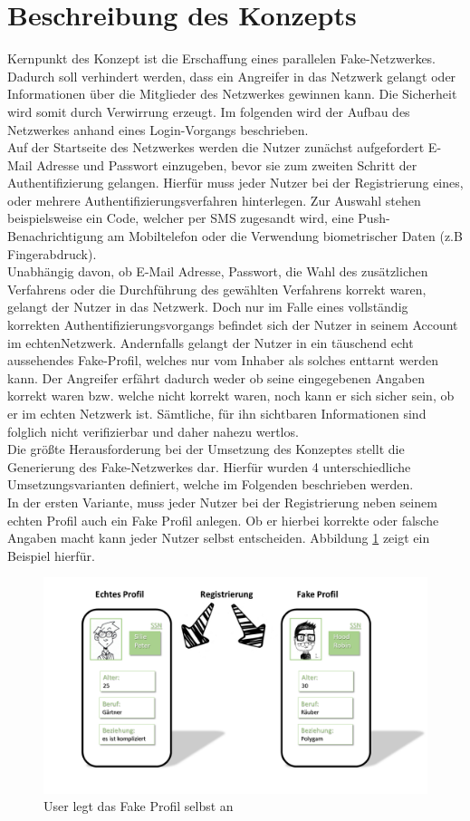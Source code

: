 \documentclass{sigchi}
\begin{document}
\section{Beschreibung des Konzepts}
\label{Konzept}
Kernpunkt des Konzept ist die Erschaffung eines parallelen Fake-Netzwerkes. Dadurch soll verhindert werden, dass ein Angreifer in das Netzwerk gelangt oder Informationen über die Mitglieder des Netzwerkes gewinnen kann. Die Sicherheit wird somit durch Verwirrung erzeugt. Im folgenden wird der Aufbau des Netzwerkes anhand eines Login-Vorgangs beschrieben. \\
Auf der Startseite des Netzwerkes werden die Nutzer zunächst aufgefordert E-Mail Adresse und Passwort einzugeben, bevor sie zum zweiten Schritt der Authentifizierung gelangen. Hierfür muss jeder Nutzer bei der Registrierung eines, oder mehrere Authentifizierungsverfahren hinterlegen. Zur Auswahl stehen beispielsweise ein Code, welcher per SMS zugesandt wird, eine Push-Benachrichtigung am Mobiltelefon oder die Verwendung biometrischer Daten (z.B Fingerabdruck).\\
Unabhängig davon, ob E-Mail Adresse, Passwort, die Wahl des zusätzlichen Verfahrens oder die Durchführung des gewählten Verfahrens korrekt waren, gelangt der Nutzer in das Netzwerk. Doch nur im Falle eines vollständig korrekten Authentifizierungsvorgangs befindet sich der Nutzer in seinem Account im \glqq echten\grqq Netzwerk. Andernfalls gelangt der Nutzer in ein täuschend echt aussehendes Fake-Profil, welches nur vom Inhaber als solches enttarnt werden kann.  Der Angreifer erfährt dadurch weder ob seine eingegebenen Angaben korrekt waren bzw. welche nicht korrekt waren, noch kann er sich sicher sein, ob er im echten Netzwerk ist. Sämtliche, für ihn sichtbaren Informationen sind folglich nicht verifizierbar und daher nahezu wertlos. \\
Die größte Herausforderung bei der Umsetzung des Konzeptes stellt die Generierung des Fake-Netzwerkes dar. Hierfür wurden 4 unterschiedliche Umsetzungsvarianten definiert, welche im Folgenden beschrieben werden. \\
In der ersten Variante, muss jeder Nutzer bei der Registrierung neben seinem echten Profil auch ein Fake Profil anlegen. Ob er hierbei korrekte oder falsche Angaben macht kann jeder Nutzer selbst entscheiden. Abbildung \ref{fig:Umsetzung1} zeigt ein Beispiel hierfür. 
\begin{figure}[htbp]
\includegraphics[width=0.8\columnwidth]{figures/Umsetzung1.PNG}
\caption{User legt das Fake Profil selbst an}
\label{fig:Umsetzung1}
\end{figure}
\end{document}
